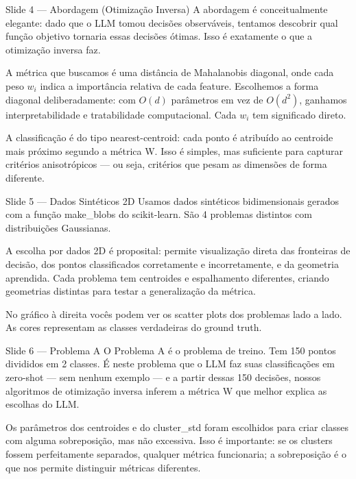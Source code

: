 \documentclass[aspectratio=169,11pt]{beamer}
\begin{document}
\begin{frame}{Slide 4 --- Abordagem (Otimização Inversa)}
\small
A abordagem é conceitualmente elegante: dado que o LLM tomou decisões observáveis, tentamos descobrir qual função objetivo tornaria essas decisões ótimas. Isso é exatamente o que a otimização inversa faz.

A métrica que buscamos é uma distância de Mahalanobis diagonal, onde cada peso $w_i$ indica a importância relativa de cada feature. Escolhemos a forma diagonal deliberadamente: com $O(d)$ parâmetros em vez de $O(d^2)$, ganhamos interpretabilidade e tratabilidade computacional. Cada $w_i$ tem significado direto.

A classificação é do tipo nearest-centroid: cada ponto é atribuído ao centroide mais próximo segundo a métrica W. Isso é simples, mas suficiente para capturar critérios anisotrópicos --- ou seja, critérios que pesam as dimensões de forma diferente.
\end{frame}

\begin{frame}{Slide 5 --- Dados Sintéticos 2D}
\small
Usamos dados sintéticos bidimensionais gerados com a função make\_blobs do scikit-learn. São 4 problemas distintos com distribuições Gaussianas.

A escolha por dados 2D é proposital: permite visualização direta das fronteiras de decisão, dos pontos classificados corretamente e incorretamente, e da geometria aprendida. Cada problema tem centroides e espalhamento diferentes, criando geometrias distintas para testar a generalização da métrica.

No gráfico à direita vocês podem ver os scatter plots dos problemas lado a lado. As cores representam as classes verdadeiras do ground truth.
\end{frame}

\begin{frame}{Slide 6 --- Problema A}
\small
O Problema A é o problema de treino. Tem 150 pontos divididos em 2 classes. É neste problema que o LLM faz suas classificações em zero-shot --- sem nenhum exemplo --- e a partir dessas 150 decisões, nossos algoritmos de otimização inversa inferem a métrica W que melhor explica as escolhas do LLM.

Os parâmetros dos centroides e do cluster\_std foram escolhidos para criar classes com alguma sobreposição, mas não excessiva. Isso é importante: se os clusters fossem perfeitamente separados, qualquer métrica funcionaria; a sobreposição é o que nos permite distinguir métricas diferentes.
\end{frame}
\end{document}
